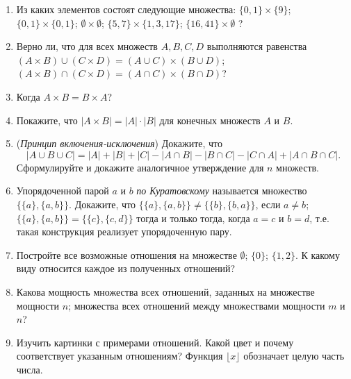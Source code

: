 \begin{enumerate}
\item Из каких элементов состоят следующие множества: 
\ipunkt $\{0, 1\} \times \{9\}$;
\ipunkt $\{0, 1\} \times \{0, 1\}$;
\ipunkt $\emptyset \times  \emptyset$;
\ipunkt $\{5, 7\} \times \{1, 3, 17\}$;
\ipunkt $\{16, 41\} \times \emptyset$ ?

\item Верно ли, что для всех множеств $A, B, C, D$ выполняются равенства
\ipunkt $(A \times B) \cup (C \times D) = (A \cup C) \times (B \cup D)$;
\ipunkt $(A \times B) \cap (C \times D) = (A \cap C) \times (B \cap D)$?

\item Когда $A\times B = B\times A$?

\item Покажите, что $|A\times B| = |A|\cdot|B|$ для конечных множеств $A$ и $B$.

\item (\textit{Принцип включения-исключения}) 
\ipunkt Докажите, что
$$|A \cup B \cup C| = |A| + |B| + |C| - |A \cap B| - |B \cap C| - |C \cap A| + |A \cap B \cap C|.$$
\ipunkt *Сформулируйте и докажите аналогичное утверждение для $n$ множеств.

\item Упорядоченной парой $a$ и $b$ \textit{по Куратовскому} называется множество $\{\{a\},\{a,b\}\}$. Докажите, что \ipunkt $\{\{a\},\{a,b\}\}\ne \{\{b\},\{b,a\}\}$, если $a\ne b$; \ipunkt
$\{\{a\},\{a,b\}\} = \{\{c\},\{c,d\}\}$ тогда и только тогда, когда $a=c$ и $b=d$, т.е. такая конструкция реализует упорядоченную пару.

\item Постройте все возможные отношения на множестве \ipunkt $\emptyset$; \ipunkt $\{0\}$; \ipunkt $\{1,2\}$. К какому виду относится каждое из полученных отношений?

\item Какова мощность \ipunkt множества всех отношений, заданных на множестве мощности $n$; \ipunkt множества всех отношений между множествами мощности $m$ и $n$?

\item Изучить картинки с примерами отношений. Какой цвет и почему соответствует указанным отношениям? Функция $\lfloor x\rfloor$ обозначает целую часть числа.


\end{enumerate}
